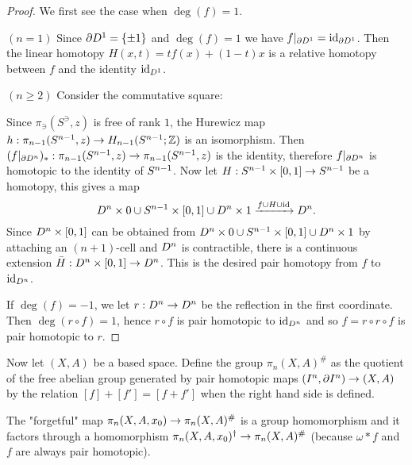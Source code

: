 \begin{proof}
We first see the case when $\deg(f)=1$.

$(n=1)$ Since $\partial D^1=\{\pm1\}$ and $\deg(f)=1$ we have $f|_{\partial D^1}=\operatorname{id}_{\partial D^1}$. Then the linear homotopy $H(x,t)=tf(x)+(1-t)x$ is a relative homotopy between $f$ and the identity $\operatorname{id}_{D^1}$.

$(n\geq2)$ Consider the commutative square:
\begin{center}
\end{center}
Since $\pi_\ni(S^\ni,z)$ is free of rank $1$, the Hurewicz map $h:\pi_{n-1}(S^{n-1},z)\to H_{n-1}(S^{n-1};{\mathbb Z})$ is an isomorphism. Then $(f|_{\partial D^n})_*:\pi_{n-1}(S^{n-1},z)\to\pi_{n-1}(S^{n-1},z)$ is the identity, therefore $f|_{\partial D^n}$ is homotopic to the identity of $S^{n-1}$. Now let $H:S^{n-1}\times [0,1]\to S^{n-1}$ be a homotopy, this gives a map
\[D^n\times0\cup S^{n-1}\times[0,1]\cup D^n\times1\xrightarrow{f\cup H\cup\operatorname{id}}D^n.\]
Since $D^n\times[0,1]$ can be obtained from $D^n\times0\cup S^{n-1}\times[0,1]\cup D^n\times1$ by attaching an $(n+1)$-cell and $D^n$ is contractible\normalmarginpar{}, there is a continuous extension $\bar{H}:D^n\times[0,1]\to D^n$. This is the desired pair homotopy from $f$ to $\operatorname{id}_{D^n}$.

If $\deg(f)=-1$, we let $r:D^n\to D^n$ be the reflection in the first coordinate. Then $\deg(r\circ f)=1$, hence $r\circ f$ is pair homotopic to $\operatorname{id}_{D^n}$ and so $f=r\circ r\circ f$ is pair homotopic to $r$.
\end{proof}

Now let $(X,A)$ be a based space. Define the group $\pi_n(X,A)^\#$ as the quotient of the free abelian group generated by pair homotopic maps $(I^n,\partial I^n)\to (X,A)$ by the relation $[f]+[f']=[f+f']$ when the right hand side is defined.

The "forgetful" map $\pi_n(X,A,x_0)\to\pi_n(X,A)^\#$ is a group homomorphism and it factors through a homomorphism $\pi_n(X,A,x_0)^\dagger\to\pi_n(X,A)^\#$ (because $\omega * f$ and $f$ are always pair homotopic).

